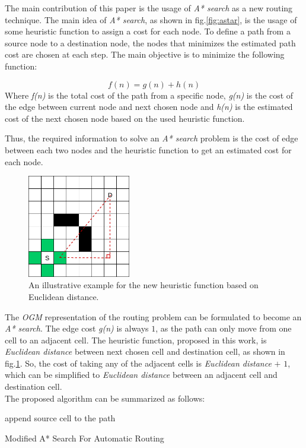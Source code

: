 The main contribution of this paper is the usage of \emph{A* search} as a new routing technique. The main idea of \emph{A* search}, as shown in fig.\ref{fig:astar}, is the usage of some heuristic function to assign a cost for each node. To define a path from a source node to a destination node, the nodes that minimizes the estimated path cost are chosen at each step. The main objective is to minimize the following function:

\begin{equation} \label{eq:astar}
f(n) = g(n) + h(n)
\end{equation}
Where \emph{f(n)} is the total cost of the path from a specific node, \emph{g(n)} is the cost of the edge between current node and next chosen node and \emph{h(n)} is the estimated cost of the next chosen node based on the used heuristic function.

Thus, the required information to solve an \emph{A* search} problem is the cost of edge between each two nodes and the heuristic function to get an estimated cost for each node.

\begin{figure}[hp]
    \centering
    \includegraphics[width=0.4\textwidth]{figures/grid_euclid.png}
    \caption{An illustrative example for the new heuristic function based on Euclidean distance.}
    \label{fig:euclid}
\end{figure}

The \emph{OGM} representation of the routing problem can be formulated to become an \emph{A* search}. The edge cost \emph{g(n)} is always $1$, as the path can only move from one cell to an adjacent cell. The heuristic function, proposed in this work, is \emph{Euclidean distance} between next chosen cell and destination cell, as shown in  fig.\ref{fig:euclid}. So, the cost of taking any of the adjacent cells is \emph{Euclidean distance} $+$ $1$, which can be simplified to \emph{Euclidean distance} between an adjacent cell and destination cell.\\

The proposed algorithm can be summarized as follows:

\begin{algorithm}[]
\SetAlgoLined
{}
 append source cell to the path\;
 \caption{Modified A* Search For Automatic Routing}
\end{algorithm}
